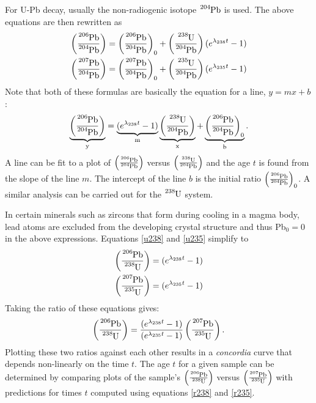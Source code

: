 \documentclass[11pt, oneside]{article}   	%
\begin{document}
 For  U-Pb decay, usually the  non-radiogenic isotope $\ce{^{204}Pb}$ is used. The above equations are then rewritten as
%
\begin{eqnarray}
\left ( \frac{\ce{^{206}Pb}}{\ce{^{204}Pb}} \right ) = \left ( \frac{\ce{^{206}Pb}}{\ce{^{204}Pb}} \right )_0   + \left ( \frac{\ce{^{238}U}}{\ce{^{204}Pb}} \right ) (e^{\lambda_{238} t}-1) \\
\left ( \frac{\ce{^{207}Pb}}{\ce{^{204}Pb}} \right ) = \left ( \frac{\ce{^{207}Pb}}{\ce{^{204}Pb}} \right )_0   + \left ( \frac{\ce{^{235}U}}{\ce{^{204}Pb}} \right ) (e^{\lambda_{235} t}-1)
\end{eqnarray}
% 
Note that both of these formulas are basically the equation for a line, $y = m x + b$:
\begin{eqnarray}
\underbrace{ \left ( \frac{\ce{^{206}Pb}}{\ce{^{204}Pb}} \right )}_\text{y} 
= 
\underbrace{  (e^{\lambda_{238} t}-1) }_\text{m}  
 \underbrace{  \left ( \frac{\ce{^{238}U}}{\ce{^{204}Pb}} \right )}_\text{x}   
 +
 \underbrace{ \left ( \frac{\ce{^{206}Pb}}{\ce{^{204}Pb}} \right )_0}_\text{b} .
\end{eqnarray}
A line can be fit to a plot of $ \left ( \frac{\ce{^{206}Pb}}{\ce{^{204}Pb}} \right )$ versus $ \left ( \frac{\ce{^{238}U}}{\ce{^{204}Pb}} \right )$ and the age $t$ is found from the slope of the line $m$. The intercept of the line  $b$ is the initial ratio $ \left ( \frac{\ce{^{206}Pb}}{\ce{^{204}Pb}} \right )_0$. A similar analysis can be carried out for the $\ce{^{238}U}$ system.

In certain minerals such as zircons that form during cooling in a magma body, lead atoms are  excluded from the developing crystal structure and thus Pb$_0 = 0$ in the above expressions.  Equations \ref{u238} and \ref{u235} simplify to
\begin{eqnarray}
\left ( \frac{\ce{^{206}Pb}}{\ce{^{238}U}} \right ) =   (e^{\lambda_{238} t}-1) \label{r238} \\
\left ( \frac{\ce{^{207}Pb}}{\ce{^{235}U}} \right ) =    (e^{\lambda_{235} t}-1)\label{r235}
\end{eqnarray}
Taking the ratio of these equations gives:
\begin{eqnarray}
\left ( \frac{\ce{^{206}Pb}}{\ce{^{238}U}} \right )  =  
\frac{ (e^{\lambda_{238} t}-1)}{  (e^{\lambda_{235} t}-1) } \left ( \frac{\ce{^{207}Pb}}{\ce{^{235}U}} \right ).
\end{eqnarray}
Plotting these two ratios against each other results in a {\it concordia} curve that depends non-linearly on the time $t$.  The age $t$ for a given sample can be determined by comparing  plots of the sample's   $\left ( \frac{\ce{^{206}Pb}}{\ce{^{238}U}} \right )$ versus $\left ( \frac{\ce{^{207}Pb}}{\ce{^{235}U}} \right  )$ with predictions for times $t$ computed using 
 equations \ref{r238} and \ref{r235}. 
 
\end{document}
